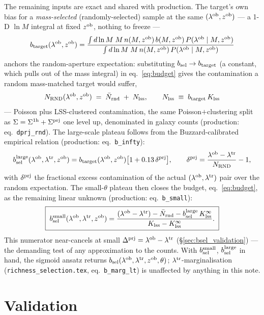 \documentclass[a4paper, 11pt]{article}
\newcommand{\lob}{\lambda^{\rm ob}}
\newcommand{\ltr}{\lambda^{\rm tr}}
\newcommand{\zob}{z^{\rm ob}}
\newcommand{\dprj}{\Delta^{\rm prj}}
\newcommand{\bsel}{b_{\rm sel}}
\newcommand{\btar}{b_{\rm target}}
\newcommand{\bsmall}{b_{\rm sel}^{\rm small}}
\newcommand{\blarge}{b_{\rm sel}^{\rm large}}
\newcommand{\Nbar}{\bar{N}_{\rm rnd}}
\newcommand{\Klss}{K_{\rm lss}}
\newcommand{\KlssInf}{K_{\rm lss}^{\infty}}
\newcommand{\Nlss}{N_{\rm lss}}
\newcommand{\Nrnd}{N_{\rm RND}}
\begin{document}
The remaining inputs are exact and shared with production. The
target's own bias for a \emph{mass-selected} (randomly-selected)
sample at the same $(\lob,\zob)$ --- a 1-D $\ln M$ integral at
fixed $\zob$, nothing to freeze ---
\begin{equation}
\btar(\lob,\zob)
= \frac{\int d\ln M\;M\,n(M,\zob)\,b(M,\zob)\,P(\lob\mid M,\zob)}
       {\int d\ln M\;M\,n(M,\zob)\,P(\lob\mid M,\zob)}
\label{eq:btar}
\end{equation}
anchors the random-aperture expectation: substituting
$\bsel\to\btar$ (a constant, which pulls out of the mass
integral) in eq.~\eqref{eq:budget} gives the contamination a
random mass-matched target would suffer,
\begin{equation}
\Nrnd(\lob,\zob) \;=\; \Nbar \;+\; \Nlss,
\qquad
\Nlss \;\equiv\; \btar\,\Klss
\label{eq:Nrnd}
\end{equation}
--- Poisson plus LSS-clustered contamination, the same
Poisson$+$clustering split as
$\Sigma=\Sigma^{\rm 1h}+\Sigma^{\rm prj}$ one level up,
denominated in galaxy counts (production:
eq.~\texttt{dprj\_rnd}). The large-scale plateau follows from
the Buzzard-calibrated empirical relation (production:
eq.~\texttt{b\_infty}):
\begin{equation}
\blarge(\lob,\ltr,\zob) = \btar(\lob,\zob)
  \big[1+0.13\,\delta^{\rm prj}\big],
\qquad
\delta^{\rm prj}=\frac{\lob-\ltr}{\Nrnd}-1,
\label{eq:blarge_frozen}
\end{equation}
with $\delta^{\rm prj}$ the fractional excess contamination of
the actual $(\lob,\ltr)$ pair over the random expectation. The
small-$\theta$ plateau then closes the budget,
eq.~\eqref{eq:budget}, as the remaining linear unknown
(production: eq.~\texttt{b\_small}):
\begin{equation}
\boxed{\;
\bsmall(\lob,\ltr,\zob) =
\frac{(\lob-\ltr)-\Nbar-\blarge\,\KlssInf}{\Klss - \KlssInf}.
\;}
\label{eq:bsmall_frozen}
\end{equation}
This numerator near-cancels at small $\dprj=\lob-\ltr$
(\S\ref{sec:bsel_validation}) --- the demanding test of any
approximation to the counts. With $\bsmall$, $\blarge$ in hand,
the sigmoid ansatz returns $\bsel(\lob,\ltr,\zob,\theta)$;
$\ltr$-marginalisation
(\texttt{richness\_selection.tex}, eq.~\texttt{b\_marg\_lt}) is
unaffected by anything in this note.

\section{Validation}
\label{sec:validation}
\end{document}
